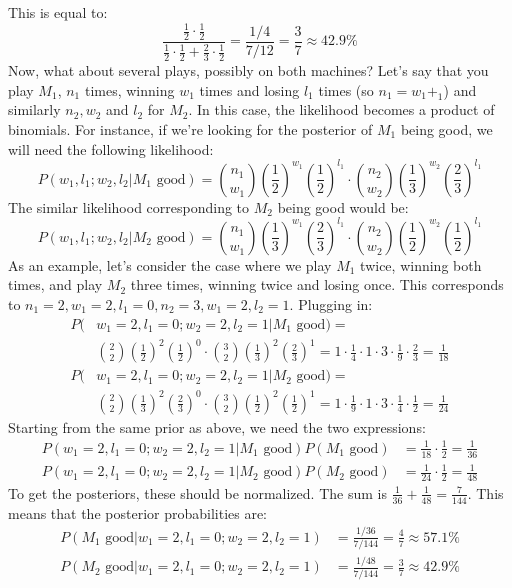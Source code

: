\documentclass[12pt, a4paper]{article}
\begin{document}
This is equal to:
\begin{equation}
\frac{\frac{1}{2}\cdot\frac{1}{2}}{\frac{1}{2}\cdot\frac{1}{2}+\frac{2}{3}\cdot\frac{1}{2}}=\frac{1/4}{7/12}=\frac{3}{7}\approx 42.9\%
\end{equation}
Now, what about several plays, possibly on both machines? Let's say that you play $M_1$, $n_1$ times, winning $w_1$ times and losing $l_1$ times (so $n_1=w_1+_1$) and similarly $n_2, w_2$ and $l_2$ for $M_2$. In this case, the likelihood becomes a product of binomials. For instance, if we're looking for the posterior of $M_1$ being good, we will need the following likelihood:
\begin{equation}
P(w_1,l_1;w_2,l_2|M_1\textrm{ good})=\binom{n_1}{w_1}\left(\frac{1}{2}\right)^{w_1}\left(\frac{1}{2}\right)^{l_1}\cdot\binom{n_2}{w_2}\left(\frac{1}{3}\right)^{w_2}\left(\frac{2}{3}\right)^{l_1}
\end{equation}
The similar likelihood corresponding to $M_2$ being good would be:
\begin{equation}
P(w_1,l_1;w_2,l_2|M_2\textrm{ good})=\binom{n_1}{w_1}\left(\frac{1}{3}\right)^{w_1}\left(\frac{2}{3}\right)^{l_1}\cdot\binom{n_2}{w_2}\left(\frac{1}{2}\right)^{w_2}\left(\frac{1}{2}\right)^{l_1}
\end{equation}
As an example, let's consider the case where we play $M_1$ twice, winning both times, and play $M_2$ three times, winning twice and losing once. This corresponds to $n_1=2, w_1=2, l_1=0, n_2=3, w_1=2, l_2=1$. Plugging in:
\begin{align*}
P(&w_1=2,l_1=0;w_2=2,l_2=1|M_1\textrm{ good})=\\
&\binom{2}{2}\left(\frac{1}{2}\right)^2\left(\frac{1}{2}\right)^0\cdot\binom{3}{2}\left(\frac{1}{3}\right)^2\left(\frac{2}{3}\right)^1=1\cdot\frac{1}{4}\cdot 1\cdot 3\cdot\frac{1}{9}\cdot\frac{2}{3}=\frac{1}{18}\\
P(&w_1=2,l_1=0;w_2=2,l_2=1|M_2\textrm{ good})=\\
&\binom{2}{2}\left(\frac{1}{3}\right)^2\left(\frac{2}{3}\right)^0\cdot\binom{3}{2}\left(\frac{1}{2}\right)^2\left(\frac{1}{2}\right)^1=1\cdot\frac{1}{9}\cdot 1\cdot 3\cdot\frac{1}{4}\cdot\frac{1}{2}=\frac{1}{24}
\end{align*}
Starting from the same prior as above, we need the two expressions:
\begin{align*}
P(w_1=2,l_1=0;w_2=2,l_2=1|M_1\textrm{ good})P(M_1\textrm{ good})&=\frac{1}{18}\cdot\frac{1}{2}=\frac{1}{36}\\
P(w_1=2,l_1=0;w_2=2,l_2=1|M_2\textrm{ good})P(M_2\textrm{ good})&=\frac{1}{24}\cdot\frac{1}{2}=\frac{1}{48}
\end{align*}
To get the posteriors, these should be normalized. The sum is $\frac{1}{36}+\frac{1}{48}=\frac{7}{144}$. This means that the posterior probabilities are:
\begin{align*}
P(M_1\textrm{ good}|w_1=2,l_1=0;w_2=2,l_2=1)&=\frac{1/36}{7/144}=\frac{4}{7}\approx 57.1\%\\
P(M_2\textrm{ good}|w_1=2,l_1=0;w_2=2,l_2=1)&=\frac{1/48}{7/144}=\frac{3}{7}\approx 42.9\%
\end{align*}
\end{document}

